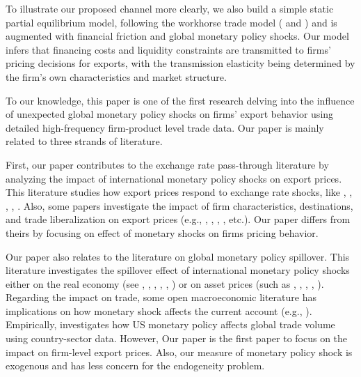 To illustrate our proposed channel more clearly, we also build a simple static partial equilibrium model, following the workhorse trade model (\cite{melitz2003impact} and \cite{manova2013credit}) and is augmented with financial friction and global monetary policy shocks. Our model infers that financing costs and liquidity constraints are transmitted to firms' pricing decisions for exports, with the transmission elasticity being determined by the firm's own characteristics and market structure. 


To our knowledge, this paper is one of the first research delving into the influence of unexpected global monetary policy shocks on firms' export behavior using detailed high-frequency firm-product level trade data. Our paper is mainly related to three strands of literature. 




First, our paper contributes to the exchange rate pass-through literature by analyzing the impact of international monetary policy shocks on export prices. This literature studies how export prices respond to exchange rate shocks, like \cite{obstfeld2000six}, \cite{amiti2014importers}, \cite{li2015exchange}, \cite{devereux2017importers}, \cite{auer2018quality}. Also, some papers investigate the impact of firm characteristics, destinations, and trade liberalization on export prices (e.g., \cite{manova2012export}, \cite{fan2015credit}, \cite{harrigan2015export}, \cite{fan2015trade}, etc.). Our paper differs from theirs by focusing on effect of monetary shocks on firms pricing behavior. 

Our paper also relates to the literature on global monetary policy spillover. This literature investigates the spillover effect of international monetary policy shocks either on the real economy (see \cite{kim2001international}, \cite{faust2003monetary}, \cite{faust2003identifying}, \cite{mackowiak2007external}, \cite{di2008impact}, \cite{bluedorn2011open}) or on asset prices (such as \cite{craine2008international}, \cite{wongswan2009response}, \cite{hausman2011global}, \cite{rogers2014evaluating}, \cite{miranda2020us}). Regarding the impact on trade, some open macroeconomic literature has implications on how monetary shock affects the current account (e.g., \cite{obstfeld1995exchange}). Empirically, \cite{lin2018international} investigates how US monetary policy affects global trade volume using country-sector data. However, Our paper is the first paper to focus on the impact on firm-level export prices. Also, our measure of monetary policy shock is exogenous and has less concern for the endogeneity problem. 

